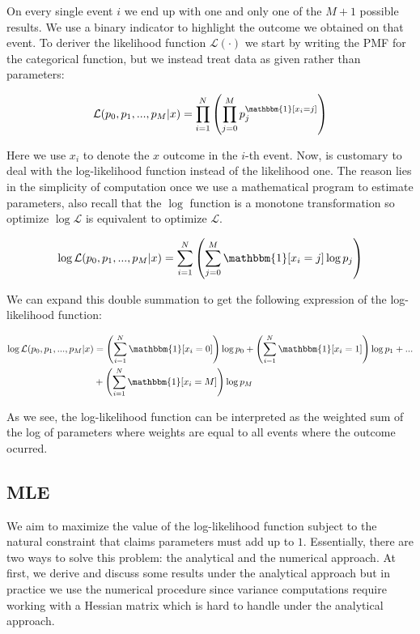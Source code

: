 \documentclass[12pt]{article}         %
\begin{document}
On every single event $i$ we end up with one and only one of the $M+1$ possible results. We use a binary indicator to highlight the outcome we obtained on that event. To deriver the likelihood function $\mathcal{L}(\cdot)$ we start by writing the PMF for the categorical function, but we instead treat data as given rather than parameters:

\begin{equation}
\mathcal{L}(p_0,p_1,...,p_M\vert x) = \prod_{i=1}^N \left(\prod_{j=0}^M p_j^{\mathbbm{1}[x_i=j]}\right)
\end{equation}

Here we use $x_i$ to denote the $x$ outcome in the $i$-th event. Now, is customary to deal with the log-likelihood function instead of the likelihood one. The reason lies in the simplicity of computation once we use a mathematical program to estimate parameters, also recall that the $\log$ function is a monotone transformation so optimize $\log\mathcal{L}$ is equivalent to optimize $\mathcal{L}$.

\begin{equation}
\log\mathcal{L}(p_0,p_1,...,p_M\vert x) = \sum_{i=1}^N \left(\sum_{j=0}^M \mathbbm{1}[x_i=j]\log p_j\right)
\end{equation}

We can expand this double summation to get the following expression of the log-likelihood function:

\begin{equation}
\begin{split}
\log\mathcal{L}(p_0,p_1,...,p_M\vert x) & = \left(\sum_{i=1}^N \mathbbm{1}[x_i=0]\right)\log p_0 + \left(\sum_{i=1}^N \mathbbm{1}[x_i=1]\right)\log p_1 + ... \\
& + \left(\sum_{i=1}^N \mathbbm{1}[x_i=M]\right)\log p_M 
\end{split}
\end{equation}

As we see, the log-likelihood function can be interpreted as the weighted sum of the log of parameters where weights are equal to all events where the outcome ocurred.

\subsection{MLE}

We aim to maximize the value of the log-likelihood function subject to the natural constraint that claims parameters must add up to $1$. Essentially, there are two ways to solve this problem: the analytical and the numerical approach. At first, we derive and discuss some results under the analytical approach but in practice we use the numerical procedure since variance computations require working with a Hessian matrix which is hard to handle under the analytical approach.
\end{document}
